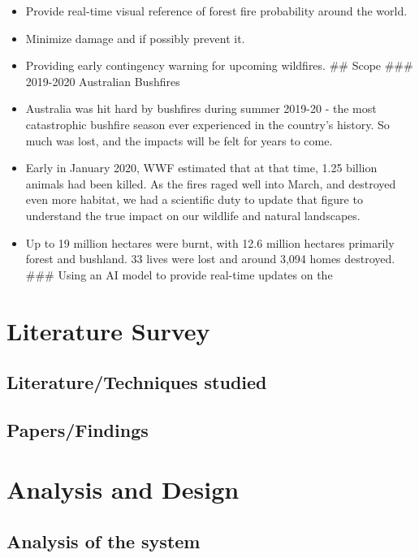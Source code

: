 \begin{itemize}
\tightlist
\item
  Provide real-time visual reference of forest fire probability around
  the world.
\item
  Minimize damage and if possibly prevent it.
\item
  Providing early contingency warning for upcoming wildfires. \#\# Scope
  \#\#\# 2019-2020 Australian Bushfires
\item
  Australia was hit hard by bushfires during summer 2019-20 - the most
  catastrophic bushfire season ever experienced in the country's
  history. So much was lost, and the impacts will be felt for years to
  come.
\item
  Early in January 2020, WWF estimated that at that time, 1.25 billion
  animals had been killed. As the fires raged well into March, and
  destroyed even more habitat, we had a scientific duty to update that
  figure to understand the true impact on our wildlife and natural
  landscapes.
\item
  Up to 19 million hectares were burnt, with 12.6 million hectares
  primarily forest and bushland. 33 lives were lost and around 3,094
  homes destroyed. \#\#\# Using an AI model to provide real-time updates
  on the
\end{itemize}

\hypertarget{literature-survey}{%
\section{Literature Survey}\label{literature-survey}}

\hypertarget{literaturetechniques-studied}{%
\subsection{Literature/Techniques
studied}\label{literaturetechniques-studied}}

\hypertarget{papersfindings}{%
\subsection{Papers/Findings}\label{papersfindings}}

\hypertarget{analysis-and-design}{%
\section{Analysis and Design}\label{analysis-and-design}}

\hypertarget{analysis-of-the-system}{%
\subsection{Analysis of the system}\label{analysis-of-the-system}}

